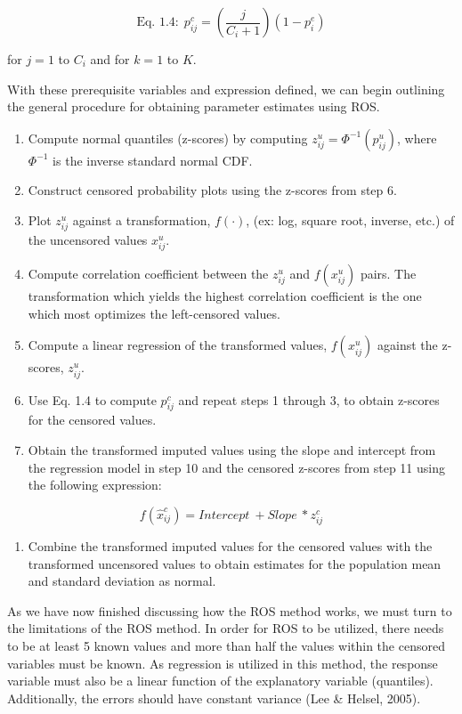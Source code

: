 \documentclass[12pt, twoside]{amherstthesis}
\providecommand{\tightlist}{%
  \setlength{\itemsep}{0pt}\setlength{\parskip}{0pt}}
\begin{document}
\[\textrm{Eq. 1.4:} \ \  p^c_{ij} = \left(\frac{j}{C_i+1}\right)(1-p^e_i)\]

for \(j = 1\) to \(C_i\) and for \(k = 1\) to \(K\).

With these prerequisite variables and expression defined, we can begin outlining the general procedure for obtaining parameter estimates using ROS.
\begin{enumerate}
\def\labelenumi{\arabic{enumi}.}
\item
  Compute normal quantiles (z-scores) by computing \(z_{ij}^{u} = \Phi^{-1}(p^u_{ij})\), where \(\Phi^{-1}\) is the inverse standard normal CDF.
\item
  Construct censored probability plots using the z-scores from step 6.
\item
  Plot \(z_{ij}^{u}\) against a transformation, \(f(\cdot)\), (ex: log, square root, inverse, etc.) of the uncensored values \(x_{ij}^{u}\).
\item
  Compute correlation coefficient between the \(z_{ij}^{u}\) and \(f(x_{ij}^{u})\) pairs. The transformation which yields the highest correlation coefficient is the one which most optimizes the left-censored values.
\item
  Compute a linear regression of the transformed values, \(f(x_{ij}^{u})\) against the z-scores, \(z_{ij}^{u}\).
\item
  Use Eq. 1.4 to compute \(p^c_{ij}\) and repeat steps 1 through 3, to obtain z-scores for the censored values.
\item
  Obtain the transformed imputed values using the slope and intercept from the regression model in step 10 and the censored z-scores from step 11 using the following expression:
\end{enumerate}
\[f(\hat{x}_{ij}^c) = {Intercept} \ + Slope \ * z_{ij}^{c}\]
\begin{enumerate}
\def\labelenumi{\arabic{enumi}.}
\setcounter{enumi}{7}
\tightlist
\item
  Combine the transformed imputed values for the censored values with the transformed uncensored values to obtain estimates for the population mean and standard deviation as normal.
\end{enumerate}
As we have now finished discussing how the ROS method works, we must turn to the limitations of the ROS method. In order for ROS to be utilized, there needs to be at least 5 known values and more than half the values within the censored variables must be known. As regression is utilized in this method, the response variable must also be a linear function of the explanatory variable (quantiles). Additionally, the errors should have constant variance (Lee \& Helsel, 2005).
\end{document}
